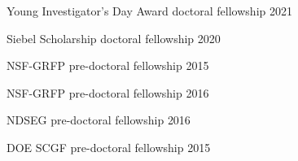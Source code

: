 

\begin{cvhonors}

  \cvhonor
    {Young Investigator's Day Award} %
    {doctoral fellowship} %
    {} %
    {2021} %
    
  \cvhonor
    {Siebel Scholarship} %
    {doctoral fellowship} %
    {} %
    {2020} %
    
  \cvhonor
    {NSF-GRFP} %
    {pre-doctoral fellowship} %
    {} %
    {2015} %
    
  \cvhonor
    {NSF-GRFP} %
    {pre-doctoral fellowship} %
    {} %
    {2016} %
    
  \cvhonor
    {NDSEG} %
    {pre-doctoral fellowship} %
    {} %
    {2016} %
    
  \cvhonor
    {DOE SCGF} %
    {pre-doctoral fellowship} %
    {} %
    {2015} %
\end{cvhonors}



